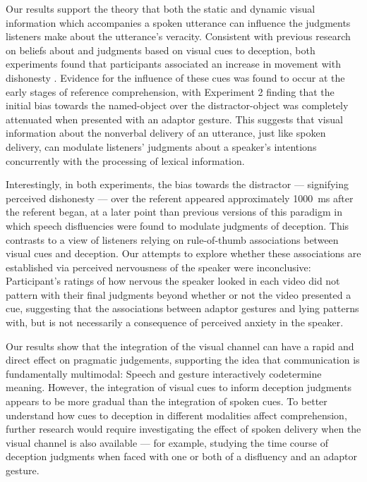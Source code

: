 \documentclass[a4paper,man,natbib]{apa6}
\begin{document}
Our results support the theory that both the static and dynamic visual information which accompanies a spoken utterance can influence the judgments listeners make about the utterance's veracity.
Consistent with previous research on beliefs about and judgments based on visual cues to deception, both experiments found that participants associated an increase in movement with dishonesty \citep{Zuckerman1981}. 
Evidence for the influence of these cues was found to occur at the early stages of reference comprehension, with Experiment 2 finding that the initial bias towards the named-object over the distractor-object was completely attenuated when presented with an adaptor gesture. 
This suggests that visual information about the nonverbal delivery of an utterance, just like spoken delivery, can modulate listeners' judgments about a speaker's intentions concurrently with the processing of lexical information.

Interestingly, in both experiments, the bias towards the distractor --- signifying perceived dishonesty --- over the referent appeared approximately 1000~ms after the referent began, at a later point than previous versions of this paradigm in which speech disfluencies were found to modulate judgments of deception. 
This contrasts to a view of listeners relying on rule-of-thumb associations between visual cues and deception.
Our attempts to explore whether these associations are established via perceived nervousness of the speaker were inconclusive: Participant's ratings of how nervous the speaker looked in each video did not pattern with their final judgments beyond whether or not the video presented a cue, suggesting that the associations between adaptor gestures and lying patterns with, but is not necessarily a consequence of perceived anxiety in the speaker.

Our results show that the integration of the visual channel can have a rapid and direct effect on pragmatic judgements, supporting the idea that communication is fundamentally multimodal: 
Speech and gesture interactively codetermine meaning.
However, the integration of visual cues to inform deception judgments appears to be more gradual than the integration of spoken cues.
To better understand how cues to deception in different modalities affect comprehension, further research would require investigating the effect of spoken delivery when the visual channel is also available --- for example, studying the time course of deception judgments when faced with one or both of a disfluency and an adaptor gesture. %


\end{document}
